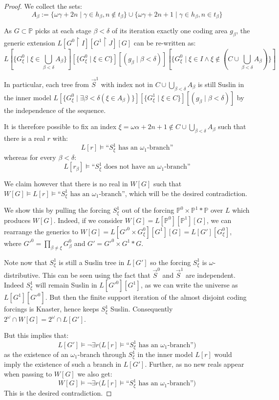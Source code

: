 \documentclass{article}
\theoremstyle{plain}
\theoremstyle{definition}
\begin{document}
\begin{proof}
We collect the sets:
$$A_{\beta} := \{\omega \gamma +2n \mid \gamma \in h_{\beta}, n \notin t_{\beta}\} \cup \{\omega \gamma + 2n+1 \mid \gamma \in h_{\beta}, n \in t_{\beta}\}$$

As $G \subset \mathbb{P}$ picks at each stage $\beta < \delta$ of its iteration exactly one coding area $g_{\beta}$, the generic extension $L[G^0 \restriction I][G^1 \restriction J][G]$ can be re-written as:
$$L[\{G^0_{\xi} \mid \xi \in \bigcup_{\beta < \delta} A_{\beta}\}][\{G^0_{\xi} \mid \xi \in C\}][(g_{\beta} \mid \beta < \delta)][\{G^0_{\xi} \mid \xi \in I \land \xi \notin (C \cup \bigcup_{\beta <\delta} A_{\beta})\}]$$

In particular, each tree from $\vec{S}^1$ with index not in $C \cup \bigcup_{\beta <\delta} A_{\beta}$ is still Suslin in the inner model $L[\{G^0_{\xi} \mid \exists \beta < \delta (\xi \in A_{\beta})\}][\{G^1_{\xi} \mid \xi \in C\}][(g_{\beta} \mid \beta < \delta)]$ by the independence of the sequence.

It is therefore possible to fix an index $\xi = \omega \alpha + 2n+1 \notin C \cup \bigcup_{\beta <\delta} A_{\beta}$ such that there is a real $r$ with:
$$L[r] \models \text{``}S^1_\xi \text{ has an } \omega_1\text{-branch''}$$
whereas for every $\beta < \delta$:
$$L[r_{\beta}] \models \text{``}S^1_\xi \text{ does not have an } \omega_1\text{-branch''}$$

We claim however that there is no real in $W[G]$ such that $W[G] \models L[r] \models \text{``}S^1_\xi \text{ has an } \omega_1\text{-branch''}$, which will be the desired contradiction.

We show this by pulling the forcing $S^1_\xi$ out of the forcing $\mathbb{P}^0 \times \mathbb{P}^1 \ast \mathbb{P}$ over $L$ which produces $W[G]$. Indeed, if we consider $W[G]=L[\mathbb{P}^0][\mathbb{P}^1][G]$, we can rearrange the generics to $W[G]= L[G'^0 \times G^0_\xi][G^1][G] = L[G'][G^0_\xi]$, where $G'^0 = \prod_{\beta \ne \xi} G^0_{\beta}$ and $G' = G'^0 \times G^1 \ast G$.

Note now that $S^1_\xi$ is still a Suslin tree in $L[G']$ so the forcing $S^1_\xi$ is $\omega$-distributive. This can be seen using the fact that $\vec{S}^0$ and $\vec{S}^1$ are independent. Indeed $S^1_\xi$ will remain Suslin in $L[G'^0][G^1]$, as we can write the universe as $L[G^1][G'^0]$. But then the finite support iteration of the almost disjoint coding forcings is Knaster, hence keeps $S^1_\xi$ Suslin. Consequently $2^{\omega} \cap W[G] = 2^{\omega} \cap L[G']$.

But this implies that:
$$L[G'] \models \neg \exists r \big( L[r] \models \text{``}S^1_\xi \text{ has an } \omega_1\text{-branch''} \big)$$
as the existence of an $\omega_1$-branch through $S^1_\xi$ in the inner model $L[r]$ would imply the existence of such a branch in $L[G']$. Further, as no new reals appear when passing to $W[G]$ we also get:
$$W[G] \models \neg \exists r \big( L[r] \models \text{``}S^1_\xi \text{ has an } \omega_1\text{-branch''} \big)$$
This is the desired contradiction.
\end{proof}
\end{document}
